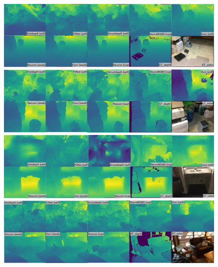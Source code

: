 \newpage
\begin{figure}
\begin{minipage}{\textwidth}
  \centerline{\includegraphics[width=1.0\textwidth]{figures/scannet_depth/787_1720.png}}
\end{minipage}
\vfill
\begin{minipage}{\linewidth}
  \centerline{\includegraphics[width=1.0\textwidth]{figures/scannet_depth/787_1930.png}}
\end{minipage}
\vfill
\begin{minipage}{\linewidth}
  \centerline{\includegraphics[width=1.0\textwidth]{figures/scannet_depth/779_1125.png}}
\end{minipage}
\begin{minipage}{\linewidth}
  \centerline{\includegraphics[width=1.0\textwidth]{figures/scannet_depth/747_97.png}}
\end{minipage}
\vspace{-3mm}
\end{figure}

